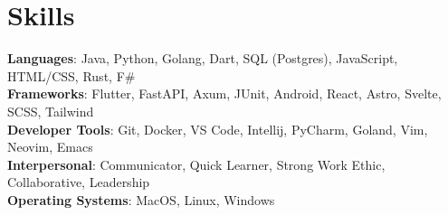 \documentclass[letterpaper,11pt]{article}
\begin{document}
\section{Skills}
 \begin{itemize}[leftmargin=0.15in, label={}]
    \small{\item{
     \textbf{Languages}{: Java, Python, Golang, Dart, SQL (Postgres), JavaScript, HTML/CSS, Rust, F\#} \\
     \textbf{Frameworks}{: Flutter, FastAPI, Axum, JUnit, Android, React, Astro, Svelte, SCSS, Tailwind} \\
     \textbf{Developer Tools}{: Git, Docker, VS Code, Intellij, PyCharm, Goland, Vim, Neovim, Emacs} \\
     \textbf{Interpersonal}{: Communicator, Quick Learner, Strong Work Ethic, Collaborative, Leadership} \\
     \textbf{Operating Systems}{: MacOS, Linux, Windows}
    }}
 \end{itemize}


\end{document}
